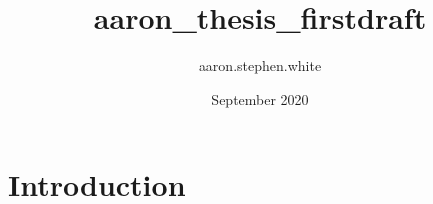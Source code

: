 \documentclass{article}
\title{aaron_thesis_firstdraft}
\author{aaron.stephen.white }
\date{September 2020}
\begin{document}
\maketitle

\section{Introduction}
\end{document}
